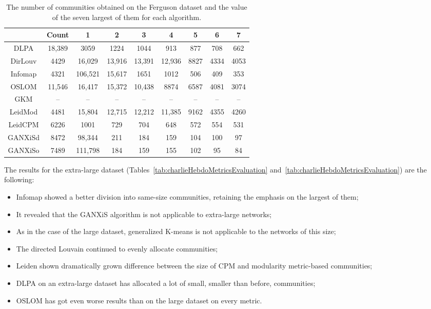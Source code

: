\begin{table}[ht]%
	\centering
	\caption{The number of communities obtained on the Ferguson dataset and the value of the seven largest of them for each algorithm.}%
	\label{tab:fergusonCommunityNumber}%
		\begin{tabular}{ c  c  c  c  c  c  c  c  c }%
			\toprule
			& Count & 1 & 2 & 3 & 4 & 5 & 6 & 7\\
			\hline
			DLPA & 18,389 & 3059 & 1224 & 1044 & 913 & 877 & 708 & 662 \\
			DirLouv & 4429 & 16,029 & 13,916 & 13,391 & 12,936 & 8827 & 4334 & 4053 \\
			Infomap & 4321 & 106,521 & 15,617 & 1651 & 1012 & 506 & 409 & 353\\
			OSLOM & 11,546 & 16,417 & 15,372 & 10,438 & 8874 & 6587 & 4081 & 3074 \\
			GKM & -- & -- & -- & -- & -- & -- & -- & -- \\
			LeidMod & 4481 & 15,804 & 12,715 & 12,212 & 11,385 & 9162 & 4355 & 4260 \\
			LeidCPM & 6226 & 1001 & 729 & 704 & 648 & 572 & 554 & 531 \\
			GANXiSd & 8472 & 98,344 & 211 & 184 & 159 & 104 & 100 & 97 \\
			GANXiSo & 7489 & 111,798 & 184 & 159 & 155 & 102 & 95 & 84\\
			\bottomrule
		\end{tabular}%
\end{table}

The results for the extra-large dataset (Tables~\cref{tab:charlieHebdoMetricsEvaluation} and~\cref{tab:charlieHebdoMetricsEvaluation}) are the following:

\begin{itemize}
	\item Infomap showed a better division into same-size communities, retaining the emphasis on the largest of them;
	\item It revealed that the GANXiS algorithm is not applicable to extra-large networks;
	\item As in the case of the large dataset, generalized K-means is not applicable to the networks of this size;
	\item The directed Louvain continued to evenly allocate communities;
	\item Leiden shown dramatically grown difference between the size of CPM and modularity metric-based communities;
	\item DLPA on an extra-large dataset has allocated a lot of small, smaller than before, communities;
	\item OSLOM has got even worse results than on the large dataset on every metric.
	
\end{itemize}

